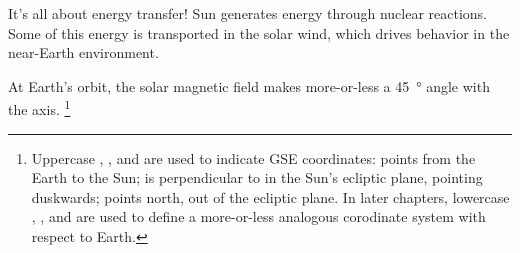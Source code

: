 


It's all about energy transfer! Sun generates energy through nuclear reactions. Some of this energy is transported in the solar wind, which drives behavior in the near-Earth environment. 


At Earth's orbit, the solar magnetic field makes more-or-less a \SI{45}{\degree} angle with the \X axis. 
\footnote{Uppercase \X, \Y, and \Z are used to indicate GSE coordinates: \X points from the Earth to the Sun; \Y is perpendicular to \X in the Sun's ecliptic plane, pointing duskwards; \Z points north, out of the ecliptic plane. In later chapters, lowercase \x, \y, and \z are used to define a more-or-less analogous corodinate system with respect to Earth. }







